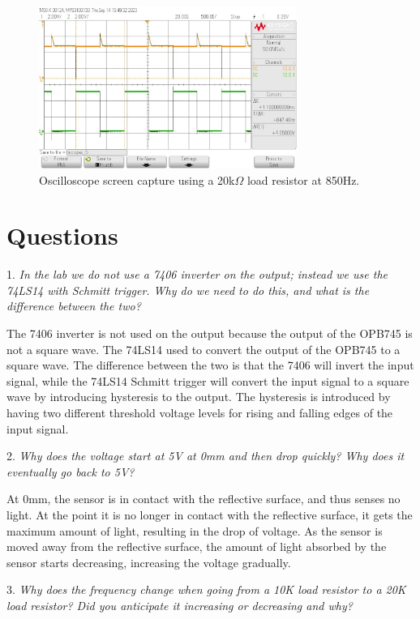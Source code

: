 \documentclass[CMPE]{KGCOEReport}
\begin{document}
\begin{figure}[H]
    \centering
    \includegraphics[width=0.75\textwidth]{output_max_20.png}
    \caption{Oscilloscope screen capture using a 20k$\Omega$ load resistor at 850Hz.}
    \label{fig:osc_20_max}
\end{figure}

\section*{Questions}

1. \emph{In the lab we do not use a 7406 inverter on the output; instead we use the 74LS14 with Schmitt trigger. Why do we need to do this, and what is the difference between the two?}

The 7406 inverter is not used on the output because the output of the OPB745 is not a square wave. The 74LS14 used to convert the output of the OPB745 to a square wave. The difference between the two is that the 7406 will invert the input signal, while the 74LS14 Schmitt trigger will convert the input signal to a square wave by introducing hysteresis to the output. The hysteresis is introduced by having two different threshold voltage levels for rising and falling edges of the input signal.
\bigskip

2. \emph{Why does the voltage start at 5V at 0mm and then drop quickly? Why does it eventually go back to 5V?}

At 0mm, the sensor is in contact with the reflective surface, and thus senses no light. At the point it is no longer in contact with the reflective surface, it gets the maximum amount of light, resulting in the drop of voltage. As the sensor is moved away from the reflective surface, the amount of light absorbed by the sensor starts decreasing, increasing the voltage gradually.
\bigskip

3. \emph{Why does the frequency change when going from a 10K load resistor to a 20K load resistor? Did you anticipate it increasing or decreasing and why?}
\end{document}
